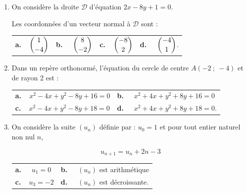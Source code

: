 \begin{enumerate}
\medskip

\item On considère la droite $\mathcal{D}$ d'équation $2x - 8y + 1 = 0$.

Les coordonnées d'un vecteur normal à $\mathcal{D}$ sont :

\medskip

\begin{tabularx}{\linewidth}{*{4}{X}}
\textbf{a.~~}$ \dbinom{1}{-4}$ &\textbf{b.~~} $\dbinom{8}{-2} $&\textbf{c.~~}$\dbinom{-8}{2} $& \textbf{d.~~} $\dbinom{-4}{1}$.
\end{tabularx}

\medskip

\item Dans un repère orthonormé, l'équation du cercle de centre $A (-2~;~-4)$ et de rayon 2
est :

\medskip

\begin{tabularx}{\linewidth}{*{2}{X}}
\textbf{a.~~}$ x^2 - 4x + y^2 - 8y + 16 = 0$ &\textbf{b.~~} $x^2 + 4x + y^2 + 8y + 16 = 0 $\\\textbf{c.~~}$ x^2 - 4x + y^2 - 8y + 18 = 0$& \textbf{d.~~} $x^2 + 4x + y^2 + 8y+ 18 = 0  $.
\end{tabularx}

\medskip

\item On considère la suite $\left(u_n\right)$ définie par : $u_0 = 1$ et pour tout entier naturel non nul $n$, 

\[u_{n+1} = u_n + 2n - 3\]

\medskip

\begin{tabularx}{\linewidth}{*{2}{X}}
\textbf{a.~~} $u_1 = 0 $ &\textbf{b.~~} $\left(u_n\right)$ est arithmétique \\\textbf{c.~~}$u_3 = -2 $& \textbf{d.~~} $\left(u_n\right)$ est décroissante.
\end{tabularx}
\end{enumerate}

\vspace{0,5cm}
